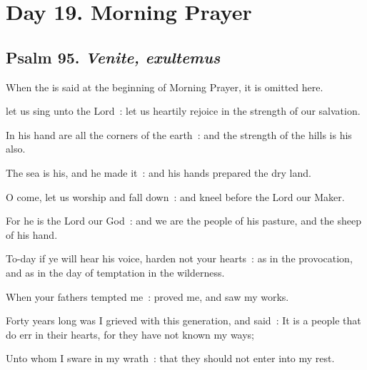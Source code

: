 \section*{Day 19. Morning Prayer}

\subsection{Psalm 95. \textit{Venite, exultemus}}

\begin{rubric}
	When the  is said at the beginning of Morning Prayer, it is omitted here.
\end{rubric}








 let us sing unto the Lord~: let us heartily rejoice in the strength of our salvation.\par
{}
In his hand are all the corners of the earth~: and the strength of the hills is his also.\par
{}The sea is his, and he made it~: and his hands prepared the dry land.\par
{}O come, let us worship and fall down~: and kneel before the Lord our Maker.\par
{}For he is the Lord our God~: and we are the people of his pasture, and the sheep of his hand.\par
{}To-day if ye will hear his voice, harden not your hearts~: as in the provocation, and as in the day of temptation in the wilderness.\par
{}When your fathers tempted me~: proved me, and saw my works.\par
{}Forty years long was I grieved with this generation, and said~: It is a people that do err in their hearts, for they have not known my ways;\par
{}Unto whom I sware in my wrath~: that they should not enter into my rest.\par

